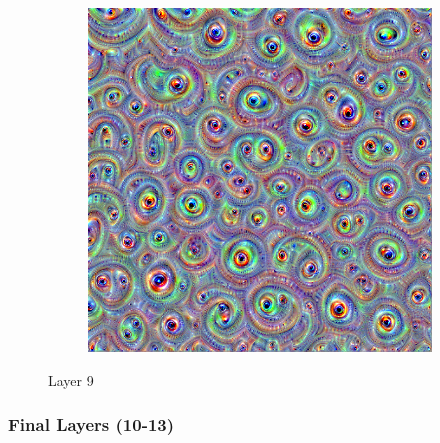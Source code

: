 \begin{figure}
    \hfill
    \begin{subfigure}[t]{0.31\textwidth}
        \captionsetup{justification=centering}
        \centering
        \includegraphics[width=.7\linewidth]{figuras/feat_vis/experiments/intermediary/l9/random_image_pl4_lr4e-2_layer19_no-blur.png}
        \caption{}
    \end{subfigure}

    \caption{Layer 9}

\end{figure}

\subsubsection{Final Layers (10-13)}

